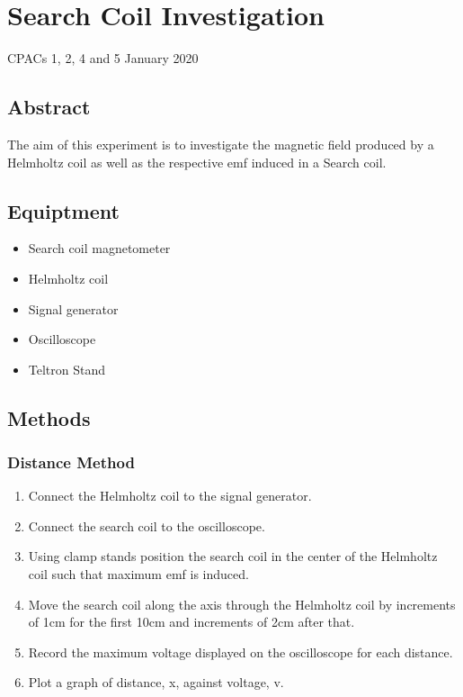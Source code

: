 \section{Search Coil Investigation}
CPACs 1, 2, 4 and 5
\hfill
{} January 2020

\subsection{Abstract}
The aim of this experiment is to investigate the magnetic field produced by a Helmholtz coil as well as the respective emf induced in a Search coil.

\subsection{Equiptment}
\begin{itemize}
\item Search coil magnetometer
\item Helmholtz coil
\item Signal generator
\item Oscilloscope
\item Teltron Stand
\end{itemize}

\subsection{Methods}

\subsubsection{Distance Method}
\begin{enumerate}
    \item Connect the Helmholtz coil to the signal generator.
    \item Connect the search coil to the oscilloscope.
    \item Using clamp stands position the search coil in the center of the Helmholtz coil such that maximum emf is induced.
    \item Move the search coil along the axis through the Helmholtz coil by increments of 1cm for the first 10cm and increments of 2cm after that.
    \item Record the maximum voltage displayed on the oscilloscope for each distance.
    \item Plot a graph of distance, x, against voltage, v.
\end{enumerate}

